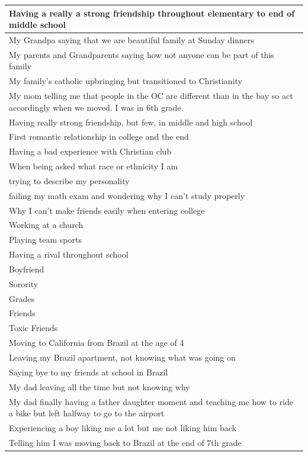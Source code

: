 \documentclass[
  .7em,
  letterpaper,
  DIV=11,
  numbers=noendperiod]{scrartcl}
\begin{document}
\begin{table}
\begin{tabular}{l}
\hline
Having a really a strong friendship throughout elementary to end of middle school\\
\hline
My Grandpa saying that we are beautiful family at Sunday dinners\\
\hline
My parents and Grandparents saying how not anyone can be part of this family\\
\hline
My family's catholic upbringing but transitioned to Christianity\\
\hline
My mom telling me that people in the OC are different than in the bay so act accordingly when we moved. I was in 6th grade.\\
\hline
Having really strong friendship, but few, in middle and high school\\
\hline
First romantic relationship in college and the end\\
\hline
Having a bad experience with Christian club\\
\hline
When being asked what race or ethnicity I am\\
\hline
trying to describe my personality\\
\hline
failing my math exam and wondering why I can't study properly\\
\hline
Why I can't make friends easily when entering college\\
\hline
Working at a church\\
\hline
Playing team sports\\
\hline
Having a rival throughout school\\
\hline
Boyfriend\\
\hline
Sorority\\
\hline
Grades\\
\hline
Friends\\
\hline
Toxic Friends\\
\hline
Moving to California from Brazil at the age of 4\\
\hline
Leaving my Brazil apartment, not knowing what was going on\\
\hline
Saying bye to my friends at school in Brazil\\
\hline
My dad leaving all the time but not knowing why\\
\hline
My dad finally having a father daughter moment and teaching me how to ride a bike but left halfway to go to the airport\\
\hline
Experiencing a boy liking me a lot but me not liking him back\\
\hline
Telling him I was moving back to Brazil at the end of 7th grade\\

\end{tabular}
\end{table}
\end{document}
